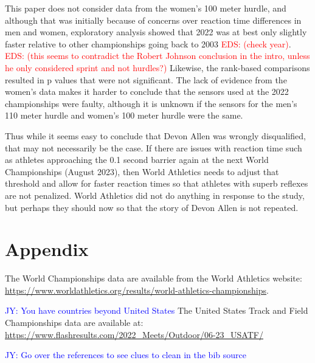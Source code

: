 \documentclass[12pt, letterpaper, titlepage]{article}
\newcommand{\jy}[1]{\textcolor{blue}{JY: #1}}
\newcommand{\eds}[1]{\textcolor{red}{EDS: (#1)}}
\newcommand{\of}[1]{\textcolor{violet}{OF: #1}}
\begin{document}

This paper does not consider data from the women's 100 meter hurdle, and although
that was initially because of concerns over reaction time differences in men and
women, exploratory analysis showed that 2022 was at best only
slightly faster relative to other championships going back to 2003 
\eds{check year}. \eds{this seems to contradict the Robert Johnson conclusion in 
the intro, unless he only considered sprint and not hurdles?} Likewise,
the rank-based comparisons resulted in p values that were not significant.  The
lack of evidence from the women's data makes it harder to conclude 
that the sensors used at the 2022 championships were faulty, although it is
unknown if the sensors for the men's 110 meter hurdle and women's 100 meter
hurdle were the same.

Thus while it seems easy
to conclude that Devon Allen was wrongly disqualified, that may not necessarily
be the case. 
If there are issues with reaction time such as athletes approaching 
the 0.1 
second barrier again at the next World Championships (August 2023), then 
World Athletics 
needs to adjust that threshold and allow for faster reaction times so that 
athletes with superb 
reflexes are not penalized. %
World Athletics did not
do anything in response to the \citet{komi2009iaaf} study, but perhaps they 
should now so
that the story of Devon Allen is not repeated.

\section*{Appendix}
\label{sec:Appendix}
The World Championships data are available from the World Athletics website:
\url{https://www.worldathletics.org/results/world-athletics-championships}.

\jy{You have countries beyond United States}
The United States Track and Field Championships data are available at: 
\url{https://www.flashresults.com/2022_Meets/Outdoor/06-23_USATF/}



\jy{Go over the references to see clues to clean in the bib source}


\end{document}
